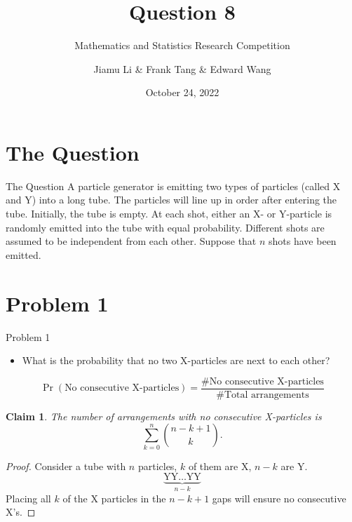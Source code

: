 \documentclass{beamer}
\title{Question 8}
\subtitle{Mathematics and Statistics Research Competition}
\author{Jiamu Li \& Frank Tang \& Edward Wang}
\institute{Scotch College}
\date{October 24, 2022}
\newtheorem{claim}{Claim}[theorem]
\DeclareMathOperator{\prob}{Pr}
\begin{document}
\begin{frame}
  \titlepage
\end{frame}

\begin{frame}
  \tableofcontents
\end{frame}

\section{The Question}
\begin{frame}{The Question}
  A particle generator is emitting two types of particles (called X and Y) into a long tube. The particles will line up in order after entering the tube. Initially, the tube is empty. At each shot, either an X- or Y-particle is randomly emitted into the tube with equal probability. Different shots are assumed to be independent from each other. Suppose that $n$ shots have been emitted.
\end{frame}
\section{Problem 1}
\begin{frame}{Problem 1}
\begin{itemize}
  \item What is the probability that no two X-particles are next to each other?
\end{itemize}

\begin{equation*}
  \prob(\text{No consecutive X-particles}) = \frac{\# \text{No consecutive X-particles}}{\# \text{Total arrangements}}
\end{equation*}

\end{frame}

\begin{frame}
\begin{claim}\label{combiformula}
  The number of arrangements with no consecutive X-particles is 
  \begin{equation}
    \sum_{k=0}^n \binom{n-k+1}{k}.
  \end{equation}
\end{claim}
\begin{proof}
  Consider a tube with $n$ particles, $k$ of them are X, $n-k$ are Y.
  \begin{equation*}
    \underbrace{\text{YY}\dots\text{YY}}_{n-k}
  \end{equation*}
  Placing all $k$ of the X particles in the $n-k+1$ gaps will ensure no consecutive X's.
\end{proof}

\end{frame}
\end{document}
